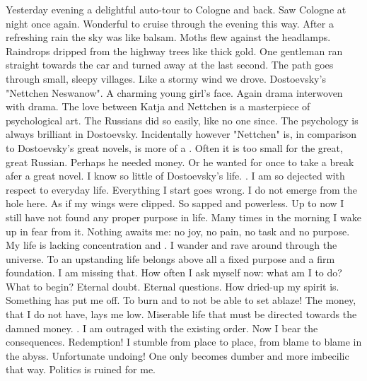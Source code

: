 
Yesterday evening a delightful auto-tour to Cologne and back. Saw Cologne at night once again. Wonderful to cruise through the evening this way. After a refreshing rain the sky was like balsam. Moths flew against the headlamps. Raindrops dripped from the highway trees like thick gold. One gentleman ran straight towards the car and turned away at the last second. The path goes through small, sleepy villages. Like a stormy wind we drove. Dostoevsky's "Nettchen Neswanow". A charming young girl's face. Again drama interwoven with drama. The love between Katja and Nettchen is a masterpiece of psychological art. The Russians did so easily, like no one since. The psychology is always brilliant in Dostoevsky. Incidentally however "Nettchen" is, in comparison to Dostoevsky's great novels, is more of a . Often it is too small for the great, great Russian. Perhaps he needed money. Or he wanted for once to take a break afer a great novel. I know so little of Dostoevsky's life. . I am so dejected with respect to everyday life. Everything I start goes wrong. I do not emerge from the hole here. As if my wings were clipped. So sapped and powerless. Up to now I still have not found any proper purpose in life. Many times in the morning I wake up in fear from it. Nothing awaits me: no joy, no pain, no task and no purpose. My life is lacking concentration and . I wander and rave around through the universe. To an upstanding life belongs above all a fixed purpose and a firm foundation. I am missing that. How often I ask myself now: what am I to do? What to begin? Eternal doubt. Eternal questions. How dried-up my spirit is. Something has put me off. To burn and to not be able to set ablaze! The money, that I do not have, lays me low. Miserable life that must be directed towards the damned money. . I am outraged with the existing order. Now I bear the consequences. Redemption! I stumble from place to place, from blame to blame in the abyss. Unfortunate undoing!  One only becomes dumber and more imbecilic that way. Politics is ruined for me.

% 
